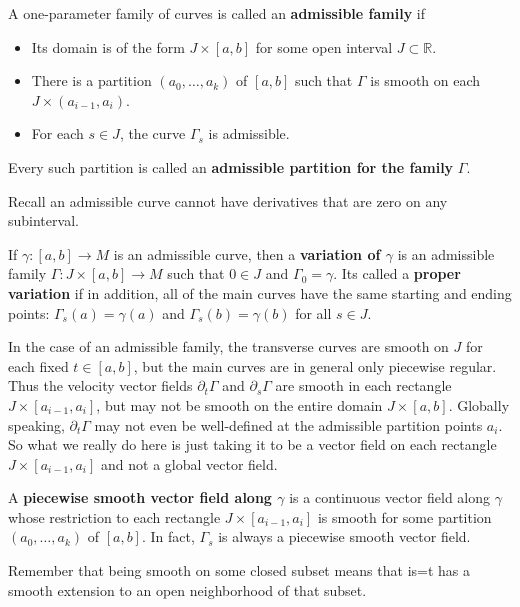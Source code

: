 \documentclass[../main.tex]{subfiles}
\begin{document}
A one-parameter family of curves is called an \textbf{admissible family} if
\begin{itemize}
  \item Its domain is of the form $J \times [a,b]$ for some open interval $J \subset \mathbb{R}$.
  \item There is a partition $(a_0, \ldots, a_k)$ of $[a,b]$ such that $\Gamma$ is smooth on each $J \times (a_{i-1}, a_i)$.
  \item For each $s \in J$, the curve $\Gamma_s$ is admissible.
\end{itemize}
Every such partition is called an \textbf{admissible partition for the family} $\Gamma$.

\begin{remark}
  Recall an admissible curve cannot have derivatives that are zero on any subinterval.
\end{remark}

If $\gamma: [a,b] \to M$ is an admissible curve, then a \textbf{variation of $\gamma$} is an admissible family $\Gamma: J \times [a,b] \to M$ such that $0 \in J$ and $\Gamma_0 = \gamma$. Its called a \textbf{proper variation} if in addition, all of the main curves have the same starting and ending points: $\Gamma_s(a) = \gamma(a)$ and $\Gamma_s(b) = \gamma(b)$ for all $s \in J$.

\begin{remark}
  In the case of an admissible family, the transverse curves are smooth on $J$ for each fixed $t \in [a,b]$, but the main curves are in general only piecewise regular. Thus the velocity vector fields $\partial_t \Gamma$ and $\partial_s \Gamma$ are smooth in each rectangle $J \times [a_{i-1}, a_i]$, but may not be smooth on the entire domain $J \times [a,b]$. Globally speaking, $\partial_t \Gamma$ may not even be well-defined at the admissible partition points $a_i$. So what we really do here is just taking it to be a vector field on each rectangle $J \times [a_{i-1}, a_i]$ and not a global vector field.
\end{remark}

A \textbf{piecewise smooth vector field along $\gamma$} is a continuous vector field along $\gamma$ whose restriction to each rectangle $J \times [a_{i-1}, a_i]$ is smooth for some partition $(a_0, \ldots, a_k)$ of $[a,b]$. In fact, $\Gamma_s$ is always a piecewise smooth vector field.

\begin{remark}
  Remember that being smooth on some closed subset means that is=t has a smooth extension to an open neighborhood of that subset.
\end{remark}
\end{document}
